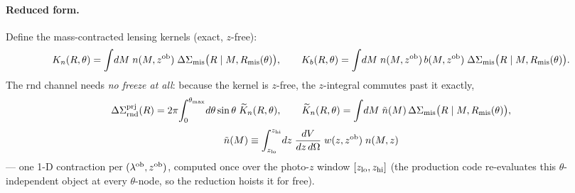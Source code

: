 \documentclass[a4paper, 11pt]{article}
\newcommand{\lob}{\lambda^{\rm ob}}
\newcommand{\zob}{z^{\rm ob}}
\newcommand{\DSprj}{\Delta\Sigma^{\rm prj}}
\newcommand{\DSmis}{\Delta\Sigma_{\rm mis}}
\newcommand{\Rmis}{R_{\rm mis}}
\begin{document}
\paragraph{Reduced form.} Define the mass-contracted lensing
kernels (exact, $z$-free):
\begin{equation}
K_n(R,\theta) = \int\!dM\; n(M,\zob)\;
\DSmis\big(R\mid M,\Rmis(\theta)\big),
\qquad
K_b(R,\theta) = \int\!dM\; n(M,\zob)\,b(M,\zob)\;
\DSmis\big(R\mid M,\Rmis(\theta)\big).
\label{eq:K_lens}
\end{equation}
The rnd channel needs \emph{no freeze at all}: because the kernel
is $z$-free, the $z$-integral commutes past it exactly,
\begin{equation}
\DSprj_{\rm rnd}(R)
= 2\pi\!\int_0^{\theta_{\max}}\! d\theta\sin\theta\;
\widetilde K_n(R,\theta),
\qquad
\widetilde K_n(R,\theta) = \int\!dM\;\tilde n(M)\,
\DSmis\big(R\mid M,\Rmis(\theta)\big),
\label{eq:rnd_exact}
\end{equation}
\begin{equation}
\tilde n(M) \equiv
\int_{z_{\rm lo}}^{z_{\rm hi}}\! dz\;
\frac{dV}{dz\,d\Omega}\;
w(z,\zob)\; n(M, z)
\label{eq:ntilde}
\end{equation}
--- one 1-D contraction per $(\lob,\zob)$, computed once over
the photo-$z$ window $[z_{\rm lo}, z_{\rm hi}]$ (the production
code re-evaluates this $\theta$-independent object at every
$\theta$-node, so the reduction hoists it for free).
\end{document}

